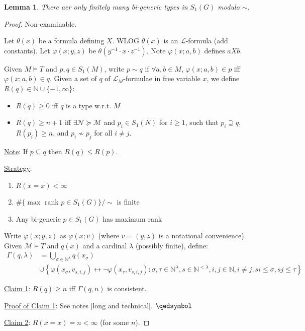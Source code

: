 \documentclass[]{article}
\theoremstyle{custhm}
\theoremstyle{cusdef}
\theoremstyle{custhm}
\newtheorem{lemma}[theorem]{Lemma}
\theoremstyle{custhm}
\theoremstyle{custhm}
\theoremstyle{ex}
\theoremstyle{custhm}
\theoremstyle{cusdef}
\theoremstyle{remark}
\theoremstyle{remark}
\theoremstyle{numremark}
\renewcommand{\L}{\mathcal{L}}
\newcommand{\M}{\mathcal{M}}
\renewcommand{\phi}{\varphi}
\newcommand{\N}{\mathcal{N}}
\newcommand{\liff}{\longleftrightarrow}
\renewcommand{\subset}{\subseteq}
\begin{document}
\begin{lemma}
	There aer only finitely many bi-generic types in $S_1(G)$ modulo $\sim$.
\end{lemma}
\begin{proof}
	Non-examinable.
	
	Let $\theta(x)$ be a formula defining $X$. WLOG $\theta(x)$ is an $\L$-formula (add constants). Let $\phi(x;y,z)$ be $\theta(y^{-1}\cdot x\cdot z^{-1})$. Note $\phi(x;a,b)$ defines $aXb$.

	Given $M\models T$ and $p,q \in S_1(M)$, write $p\sim q$ if $\forall a,b\in M$, $\phi(x;a,b)\in p$ iff $\phi(x;a,b)\in q$. Given a set of $q$ of $\L_M$-formulae in free variable $x$, we define $R(q)\in\mathbb{N}\cup\{-1,\infty\}$:
	\begin{itemize}
		\item $R(q)\ge 0$ iff $q$ is a type w.r.t. $M$
		\item $R(q)\ge n+1$ iff $\exists \N \succeq \M$ and $p_i \in S_1(N)$ for $i\ge 1$, such that $p_i\supseteq q$, $R(p_i) \ge n$, and $p_i \not\sim p_j$ for all $i\ne j$.
	\end{itemize}


\underline{Note}: If $p\subset q$ then $R(q)\le R(p)$.

\underline{Strategy}:\ 
\begin{enumerate}
	\item $R(x=x) < \infty$
	\item $\#\{\max\textrm{ rank }p\in S_1(G)\}/\sim$ is finite
	\item Any bi-generic $p \in S_1(G)$ has maximum rank
\end{enumerate}
Write $\phi(x;y,z)$ as $\phi(x;v)$ (where $v = (y,z)$ is a notational convenience). Given $\M\models T$ and $q(x)$ and a cardinal $\lambda$ (possibly finite), define:
\begin{align*}
	\Gamma(q,\lambda) &= \bigcup_{\sigma\in\mathbb{N}^\lambda}q(x_\sigma)\\
	&\cup\left\lbrace \phi(x_\sigma,v_{s,i,j})\liff \neg\phi(x_\tau,v_{s,i,j}): \sigma,\tau\in\mathbb{N}^\lambda,s\in\mathbb{N}^{<\lambda},i,j\in\mathbb{N},i\ne j, si\le \sigma, sj\le \tau\right\rbrace
\end{align*}

\underline{Claim 1}: $R(q)\ge n$ iff $\Gamma(q,n)$ is consistent.

\underline{Proof of Claim 1}: See notes [long and technical]. $\qedsymbol$

\underline{Claim 2}: $R(x=x) = n < \infty$ (for some $n$).


\end{proof}
\end{document}
